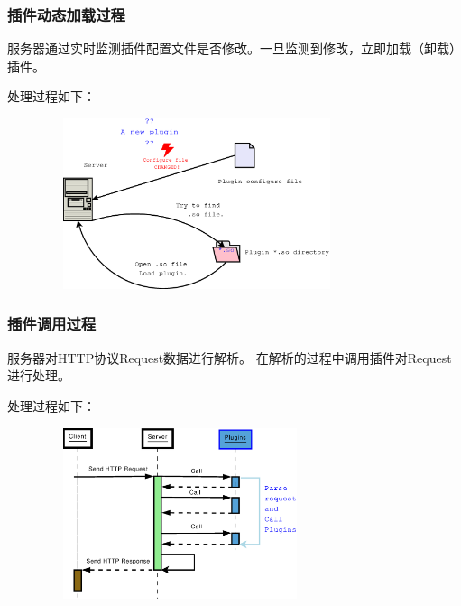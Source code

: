 \documentclass[10pt,dvipdfm]{beamer}
\begin{document}
\begin{frame}
	\frametitle{插件动态加载过程}
	
	服务器通过实时监测插件配置文件是否修改。一旦监测到修改，立即加载（卸载）插件。
	
	\pause
	
	\begin{block}{处理过程如下：}
	\begin{figure}[htbp]
	\centering
	\includegraphics[height=5cm, width=9cm]{pics/loadplugin.eps}
	\end{figure}
	\end{block}
\end{frame}

\begin{frame}
	\frametitle{插件调用过程}
	服务器对HTTP协议Request数据进行解析。	在解析的过程中调用插件对Request进行处理。
	
	\pause
	
	\begin{block}{处理过程如下：}
	\begin{figure}[htbp]
	\centering
	\includegraphics[height=5cm, width=8cm]{pics/httpplugin.eps}
	\end{figure}
	\end{block}
\end{frame}
\end{document}
